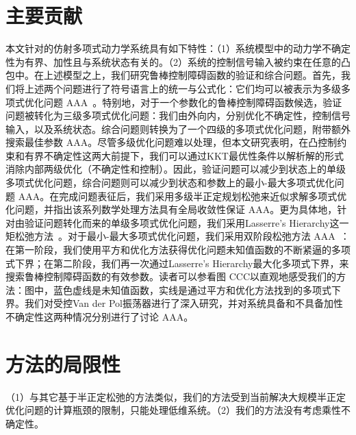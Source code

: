 \section{主要贡献}
本文针对的仿射多项式动力学系统具有如下特性：（1）系统模型中的动力学不确定性为有界、加性且与系统状态有关的。（2）系统的控制信号输入被约束在任意的凸包中。在上述模型之上，我们研究鲁棒控制障碍函数的验证和综合问题。首先，我们将上述两个问题进行了符号语言上的统一与公式化：它们均可以被表示为多级多项式优化问题{\color{red} AAA}~\cite{bennett22mp-hierarchical}。特别地，对于一个参数化的鲁棒控制障碍函数候选，验证问题被转化为三级多项式优化问题：我们由外向内，分别优化不确定性，控制信号输入，以及系统状态。综合问题则转换为了一个四级的多项式优化问题，附带额外搜索最佳参数{\color{red} AAA}。尽管多级优化问题难以处理，但本文研究表明，在凸控制约束和有界不确定性这两大前提下，我们可以通过KKT最优性条件以解析解的形式消除内部两级优化（不确定性和控制）。因此，验证问题可以减少到状态上的单级多项式优化问题，综合问题则可以减少到状态和参数上的最小-最大多项式优化问题{\color{red} AAA}。在完成问题表征后，我们采用多级半正定规划松弛来近似求解多项式优化问题，并指出该系列数学处理方法具有全局收敛性保证{\color{red} AAA}。更为具体地，针对由验证问题转化而来的单级多项式优化问题，我们采用Lasserre's Hierarchy这一矩松弛方法~\cite{lasserre01siopt-global}。对于最小-最大多项式优化问题，我们采用双阶段松弛方法{\color{red} AAA}~\cite{lasserre11jgo-minmaxpop}：在第一阶段，我们使用平方和优化方法获得优化问题未知值函数的不断紧逼的多项式下界；在第二阶段，我们再一次通过Lasserre's Hierarchy最大化多项式下界，来搜索鲁棒控制障碍函数的有效参数。读者可以参看图{\color{red} CCC}以直观地感受我们的方法：图中，蓝色虚线是未知值函数，实线是通过平方和优化方法找到的多项式下界。我们对受控Van der Pol振荡器进行了深入研究，并对系统具备和不具备加性不确定性这两种情况分别进行了讨论{\color{red} AAA}。

\section{方法的局限性}
（1）与其它基于半正定松弛的方法类似，我们的方法受到当前解决大规模半正定优化问题的计算瓶颈的限制，只能处理低维系统。（2）我们的方法没有考虑乘性不确定性。


